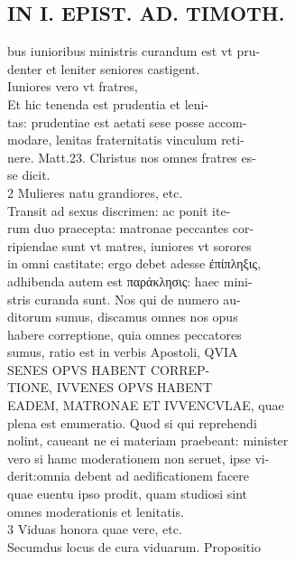 \documentclass{article}
\begin{document}
\begin{pages}
\section*{IN I. EPIST. AD. TIMOTH. \\
                }
bus iunioribus ministris curandum est vt pru- \\
                denter et leniter seniores castigent. \\
                Iuniores vero vt fratres, \\
                Et hic tenenda est prudentia et leni- \\
                tas: prudentiae est aetati sese posse accom- \\
                modare, lenitas fraternitatis vinculum reti- \\
                nere. Matt.23. Christus nos omnes fratres es- \\
                se dicit. \\
                2 Mulieres natu grandiores, etc. \\
                Transit ad sexus discrimen: ac ponit ite- \\
                rum duo praecepta: matronae peccantes cor- \\
                ripiendae sunt vt matres, iuniores vt sorores \\
                in omni castitate: ergo debet adesse ἐπίπληξις, \\
                adhibenda autem est παράκλησις: haec mini- \\
                stris curanda sunt. Nos qui de numero au- \\
                ditorum sumus, discamus omnes nos opus \\
                habere correptione, quia omnes peccatores \\
                sumus, ratio est in verbis Apostoli, QVIA \\
                SENES OPVS HABENT CORREP- \\
                TIONE, IVVENES OPVS HABENT \\
                EADEM, MATRONAE ET IVVENCVLAE, quae \\
                plena est enumeratio. Quod si qui reprehendi \\
                nolint, caueant ne ei materiam praebeant: minister \\
                vero si hamc moderationem non seruet, ipse vi- \\
                derit:omnia debent ad aedificationem facere \\
                quae euentu ipso prodit, quam studiosi sint \\
                omnes moderationis et lenitatis. \\
                3 Viduas honora quae vere, etc. \\
                Secumdus locus de cura viduarum. Propositio \\
                

\end{pages}
\end{document}
